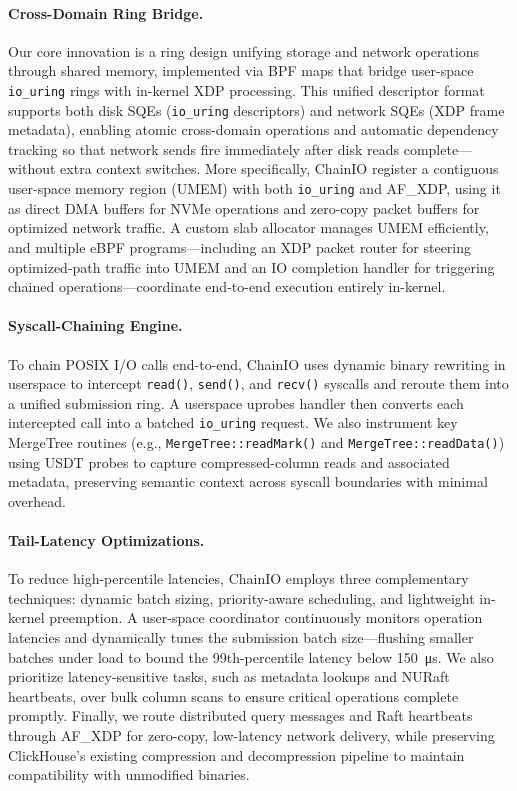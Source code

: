 \documentclass[sigconf,10pt]{acmart}
\newcommand{\sys}{ChainIO\xspace}
\begin{document}
\paragraph{Cross-Domain Ring Bridge.} Our core innovation is a ring design unifying storage and network operations through shared memory, implemented via BPF maps that bridge user-space \texttt{io\_uring} rings with in-kernel XDP processing. This unified descriptor format supports both disk SQEs (\texttt{io\_uring} descriptors) and network SQEs (XDP frame metadata), enabling atomic cross-domain operations and automatic dependency tracking so that network sends fire immediately after disk reads complete—without extra context switches. More specifically, \sys register a contiguous user-space memory region (UMEM) with both \texttt{io\_uring} and AF\_XDP, using it as direct DMA buffers for NVMe operations and zero-copy packet buffers for optimized network traffic. A custom slab allocator manages UMEM efficiently, and multiple eBPF programs—including an XDP packet router for steering optimized-path traffic into UMEM and an IO completion handler for triggering chained operations—coordinate end-to-end execution entirely in-kernel.


\paragraph{Syscall-Chaining Engine.} To chain POSIX I/O calls end-to-end, \sys uses dynamic binary rewriting in userspace to intercept \texttt{read()}, \texttt{send()}, and \texttt{recv()} syscalls and reroute them into a unified submission ring. A userspace uprobes\cite{bpftime} handler then converts each intercepted call into a batched \texttt{io\_uring} request. We also instrument key MergeTree routines (e.g., \texttt{MergeTree::readMark()} and \texttt{MergeTree::readData()}) using USDT probes to capture compressed-column reads and associated metadata, preserving semantic context across syscall boundaries with minimal overhead.

\paragraph{Tail-Latency Optimizations.} To reduce high-percentile latencies, \sys employs three complementary techniques: dynamic batch sizing, priority-aware scheduling, and lightweight in-kernel preemption. A user-space coordinator continuously monitors operation latencies and dynamically tunes the submission batch size—flushing smaller batches under load to bound the 99th-percentile latency below \SI{150}{\micro\second}. We also prioritize latency-sensitive tasks, such as metadata lookups and NURaft heartbeats, over bulk column scans to ensure critical operations complete promptly. Finally, we route distributed query messages and Raft heartbeats through AF\_XDP for zero-copy, low-latency network delivery, while preserving ClickHouse's existing compression and decompression pipeline to maintain compatibility with unmodified binaries.
\end{document}
